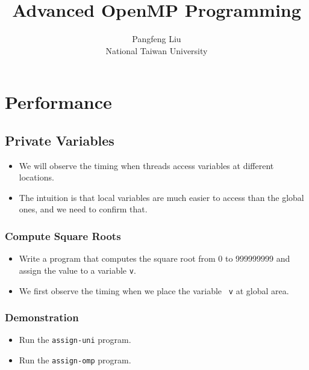 \documentclass{beamer}
\begin{document}
\title{Advanced OpenMP Programming}

\author{Pangfeng Liu \\ National Taiwan University}

\begin{frame}
  \titlepage
\end{frame}

\section{Performance}

\subsection{Private Variables}

\begin{frame}
  \begin{itemize}
  \item We will observe the timing when threads access variables at
    different locations.
  \item The intuition is that local variables are much easier to
    access than the global ones, and we need to confirm that.
  \end{itemize}
\end{frame}

\begin{frame}
  \frametitle{Compute Square Roots}
  \begin{itemize}
    \item Write a program that computes the square root from 0 to
      999999999 and assign the value to a variable {\tt v}.
    \item We first observe the timing when we place the variable {\tt
      v} at global area.
  \end{itemize}
\end{frame}

\begin{frame}
\end{frame}

\begin{frame}
  \frametitle{Demonstration}
  \begin{itemize}
  \item Run the {\tt assign-uni} program.
  \item Run the {\tt assign-omp} program.
  \end{itemize}
\end{frame}
\end{document}
